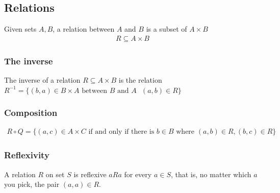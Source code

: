 \documentclass[a4paper]{article}
\theoremstyle{plain}
\theoremstyle{definition}
\newtheorem{defn}{Definition}[section]
\theoremstyle{remark}
\begin{document}
\subsection{Relations}
\begin{tcolorbox}[colback=black!3!white,colframe=black!60!white,title=\begin{defn}Relation \label{Relation}\end{defn}]
Given sets $A,B$, a relation between $A$ and $B$ is a subset of $A \times B$
\begin{align}
	R \subseteq A \times B
\end{align}
\end{tcolorbox}

\subsubsection{The inverse}
\begin{tcolorbox}[colback=black!3!white,colframe=black!60!white,title=\begin{defn}Inverse of a relation \label{Inverse of a relation}\end{defn}]
The inverse of a relation $R \subseteq A \times B$ is the relation $R^{-1}=\{(b,a) \in B \times  A \text{ between $B$ and $A $ } (a,b) \in R \}$

\end{tcolorbox}

\subsubsection{Composition}
\begin{tcolorbox}[colback=black!3!white,colframe=black!60!white,title=\begin{defn}Composition of sets \label{Composition of sets}\end{defn}]
\begin{align}
	R \circ Q = \{ (a,c) \in A \times C \text{ if and only if there is } b \in B \text{ where } (a,b) \in R, (b,c) \in R\}
\end{align}
\end{tcolorbox}
\subsubsection{Reflexivity}
\begin{tcolorbox}[colback=black!3!white,colframe=black!60!white,title=\begin{defn}Reflexivity \label{Reflexivity}\end{defn}]

A relation $R$ on set $S$ is reflexive $aRa$ for every $a \in S$, that is, no matter which $a$ you pick, the pair $(a,a) \in R$. 
\end{tcolorbox}
\end{document}
